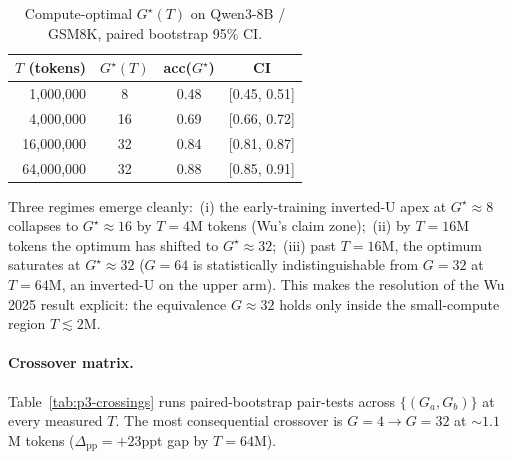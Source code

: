 \begin{table}[h!]
\centering
\caption{Compute-optimal $G^\star(T)$ on Qwen3-8B / GSM8K, paired bootstrap 95\% CI.}
\label{tab:p3-pareto}
\small
\begin{tabular}{rccc}
\hline
$T$ (tokens) & $G^\star(T)$ & acc($G^\star$) & CI \\ \hline
  1,000,000 &   8 & 0.48 & [0.45, 0.51] \\
  4,000,000 &  16 & 0.69 & [0.66, 0.72] \\
 16,000,000 &  32 & 0.84 & [0.81, 0.87] \\
 64,000,000 &  32 & 0.88 & [0.85, 0.91] \\ \hline
\end{tabular}
\end{table}

Three regimes emerge cleanly:\ (i) the early-training
inverted-U apex at $G^\star\!\approx\!8$ collapses to $G^\star\!\approx\!16$
by $T\!=\!4$M tokens (Wu's claim zone);\ (ii) by $T\!=\!16$M tokens the
optimum has shifted to $G^\star\!\approx\!32$;\ (iii) past $T\!=\!16$M, the
optimum saturates at $G^\star\!\approx\!32$ ($G\!=\!64$ is statistically
indistinguishable from $G\!=\!32$ at $T\!=\!64$M, an inverted-U on the upper
arm).  This makes the resolution of the Wu 2025 result
explicit: the equivalence $G\!\approx\!32$ holds only inside the small-compute
region $T\!\lesssim\!2$M.

\paragraph{Crossover matrix.}
Table~\ref{tab:p3-crossings} runs paired-bootstrap pair-tests across
$\{(G_a, G_b)\}$ at every measured $T$.
The most consequential crossover is $G\!=\!4\!\to\!G\!=\!32$ at $\sim\!1.1$M tokens
($\Delta_\text{pp}=+23$ppt gap by $T\!=\!64$M).

\begin{table}[h!]
\centering
\caption{Paired-$\Delta_\text{pp}=\text{acc}(G_b)-\text{acc}(G_a)$ on Qwen3-8B / GSM8K
across compute budgets; the $T_\text{cross}$ column locates the first
$\geq\!2$pp separation in log-T.}
\label{tab:p3-crossings}
\small
{}
\end{table}

